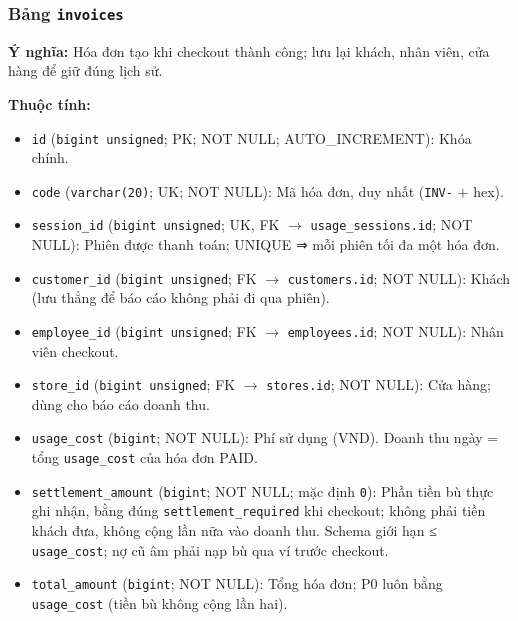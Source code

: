 \subsubsection{Bảng \texttt{invoices}}

\textbf{Ý nghĩa:} Hóa đơn tạo khi checkout thành công; lưu lại khách, nhân viên, cửa hàng để giữ đúng lịch sử.\par

\textbf{Thuộc tính:}

\begin{itemize}

\item \texttt{id} (\texttt{bigint unsigned}; PK; NOT NULL; AUTO_INCREMENT): Khóa chính.

\item \texttt{code} (\texttt{varchar(20)}; UK; NOT NULL): Mã hóa đơn, duy nhất (\texttt{INV-} + hex).

\item \texttt{session\_id} (\texttt{bigint unsigned}; UK, FK $\rightarrow$ \texttt{usage\_sessions.id}; NOT NULL): Phiên được thanh toán; UNIQUE ⇒ mỗi phiên tối đa một hóa đơn.

\item \texttt{customer\_id} (\texttt{bigint unsigned}; FK $\rightarrow$ \texttt{customers.id}; NOT NULL): Khách (lưu thẳng để báo cáo không phải đi qua phiên).

\item \texttt{employee\_id} (\texttt{bigint unsigned}; FK $\rightarrow$ \texttt{employees.id}; NOT NULL): Nhân viên checkout.

\item \texttt{store\_id} (\texttt{bigint unsigned}; FK $\rightarrow$ \texttt{stores.id}; NOT NULL): Cửa hàng; dùng cho báo cáo doanh thu.

\item \texttt{usage\_cost} (\texttt{bigint}; NOT NULL): Phí sử dụng (VND). Doanh thu ngày = tổng \texttt{usage\_cost} của hóa đơn PAID.

\item \texttt{settlement\_amount} (\texttt{bigint}; NOT NULL; mặc định \texttt{0}): Phần tiền bù thực ghi nhận, bằng đúng \texttt{settlement\_required} khi checkout; không phải tiền khách đưa, không cộng lần nữa vào doanh thu. Schema giới hạn ≤ \texttt{usage\_cost}; nợ cũ âm phải nạp bù qua ví trước checkout.

\item \texttt{total\_amount} (\texttt{bigint}; NOT NULL): Tổng hóa đơn; P0 luôn bằng \texttt{usage\_cost} (tiền bù không cộng lần hai).


\end{itemize}
